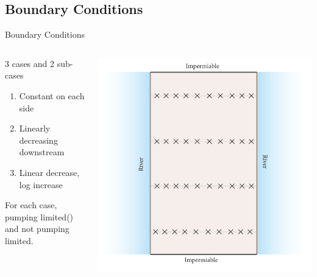 \documentclass[xcolor=x11names,compress]{beamer}
\renewcommand{\(}{\begin{columns}}
\renewcommand{\)}{\end{columns}}
\newcommand{\<}[1]{\begin{column}{#1}}
\renewcommand{\>}{\end{column}}
\begin{document}
\subsection{Boundary Conditions}
\begin{frame}{Boundary Conditions}

\begin{columns}
\begin{column}{.4\textwidth}
3 cases and 2 sub-cases
\begin{enumerate}
\item Constant on each side 
\item Linearly decreasing downstream
\item Linear decrease, log increase
\end{enumerate} 
For each case, pumping limited() and not pumping limited. 
\end{column}
\begin{column}{.6\textwidth}
\includegraphics[width=\textwidth]{site.pdf} 
\end{column}
\end{columns}
\end{frame}


\end{document}
